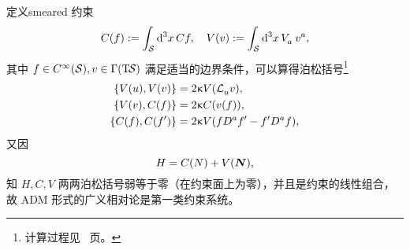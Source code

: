 
		定义smeared 约束
		\begin{equation}
			C(f) \definedby \int_{\spc} \dd[3]{x} C f  \qc V ({v}) \definedby \int_{\spc} \dd[3]{x} \tensor{V}{_a} \tensor{v}{^a},
		\end{equation}
		其中 $f\in C^\infty(\mathcal{S}), v\in \Gamma(\mathrm{T}_{{}}\!{\mathcal{S}})$ 满足适当的边界条件，可以算得泊松括号\footnote{计算过程见~\pageref{ap-eq-ADM_constrain_alg} 页。}
		\begin{equation}
			\begin{split}
				\left\{ V({u}), V({v}) \right\} &= 2\gkappa V(\Ld{{u}} {v}),\\
				\left\{ V({v}), C(f) \right\} &= 2\gkappa C(v(f)),\\
				\left\{ C(f), C(f') \right\} &= 2\gkappa V(f\tensor{D}{^a}f'-f' \tensor{D}{^a}f),\label{eq-ADM_constrain_alg}
			\end{split}
		\end{equation}
		又因
		\begin{equation}
			H = C(N) + V(\vb*{N}),
		\end{equation}
		知 $H,C,V$ 两两泊松括号弱等于零（在约束面上为零），并且是约束的线性组合，故 ADM 形式的广义相对论是第一类约束系统。


